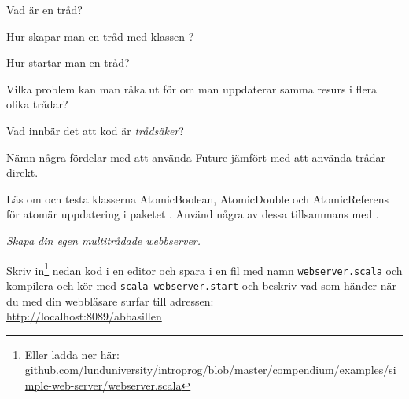 \Subtask Vad är en tråd?

\Subtask Hur skapar man en tråd med klassen ?

\Subtask Hur startar man en tråd?

\Subtask Vilka problem kan man råka ut för om man uppdaterar samma resurs i flera olika trådar? 

\Subtask Vad innbär det att kod är \emph{trådsäker}?

\Subtask Nämn några fördelar med att använda Future jämfört med att använda trådar direkt.


\Task Läs om och testa klasserna AtomicBoolean, AtomicDouble och AtomicReferens för atomär uppdatering i paketet . Använd några av dessa tillsammans med . 



\newpage


\AdvancedTasks %

\Task \emph{Skapa din egen multitrådade webbserver.} 

\Subtask Skriv in\footnote{Eller ladda ner här: \href{https://github.com/lunduniversity/introprog/blob/master/compendium/examples/simple-web-server/webserver.scala}{github.com/lunduniversity/introprog/blob/master/compendium/examples/simple-web-server/webserver.scala}} nedan kod i en editor och spara i en fil med namn \texttt{webserver.scala} och kompilera och kör med \texttt{scala webserver.start} och beskriv vad som händer när du med din webbläsare surfar till adressen: \\ \url{http://localhost:8089/abbasillen}



